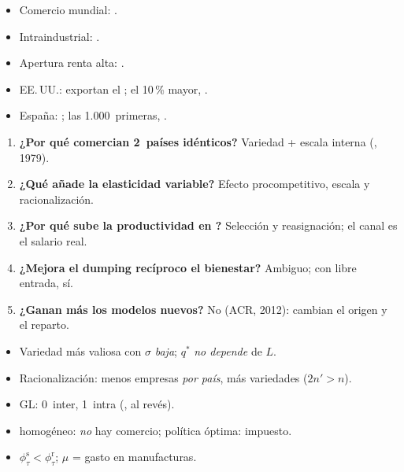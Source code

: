\documentclass{article}
\begin{document}
\begin{columnas}
\anexorepaso
{}
\begin{itemize}
\item Comercio mundial: .
\item Intraindustrial: .
\item Apertura renta alta: .
\item EE.\,UU.: exportan el ; el 10\,\% mayor, .
\item España: ; las 1.000~primeras, .
\end{itemize}
\begin{enumerate}
\item \textbf{¿Por qué comercian 2~países idénticos?} Variedad + escala interna (, 1979).
\item \textbf{¿Qué añade la elasticidad variable?} Efecto procompetitivo, escala y racionalización.
\item \textbf{¿Por qué sube la productividad en ?} Selección y reasignación; el canal es el salario real.
\item \textbf{¿Mejora el dumping recíproco el bienestar?} Ambiguo; con libre entrada, sí.
\item \textbf{¿Ganan más los modelos nuevos?} No (ACR, 2012): cambian el origen y el reparto.
\end{enumerate}
\begin{trampa}
\begin{itemize}
\item Variedad más valiosa con $\sigma$ \emph{baja}; $q^*$ \emph{no depende} de $L$.
\item Racionalización: menos empresas \emph{por país}, más variedades ($2n'>n$).
\item GL: 0~inter, 1~intra (, al revés).
\item {} homogéneo: \emph{no} hay comercio; política óptima: impuesto.
\item $\phi^{\mathrm s}_\tau<\phi^{\mathrm r}_\tau$; $\mu$ = gasto en manufacturas.
\end{itemize}
\end{trampa}

\end{columnas}
\end{document}
